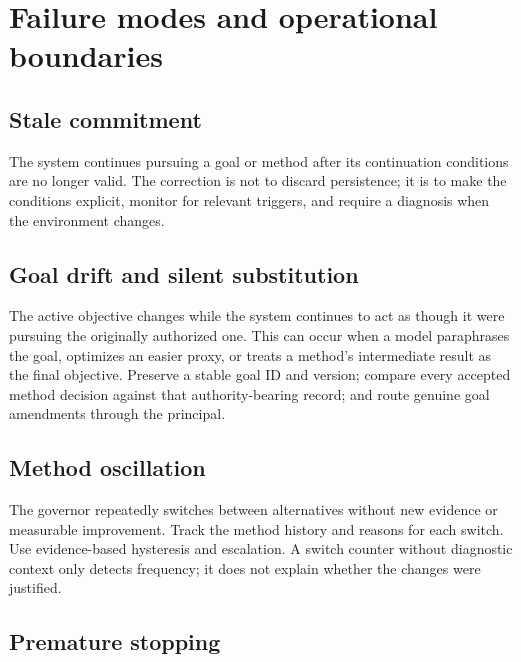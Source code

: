 
\section{Failure modes and operational boundaries}
\label{sec:ch15-failures}

\subsection{Stale commitment}

The system continues pursuing a goal or method after its continuation conditions are no longer valid. The correction is not to discard persistence; it is to make the conditions explicit, monitor for relevant triggers, and require a diagnosis when the environment changes.

\subsection{Goal drift and silent substitution}

The active objective changes while the system continues to act as though it were pursuing the originally authorized one. This can occur when a model paraphrases the goal, optimizes an easier proxy, or treats a method's intermediate result as the final objective. Preserve a stable goal ID and version; compare every accepted method decision against that authority-bearing record; and route genuine goal amendments through the principal.

\subsection{Method oscillation}

The governor repeatedly switches between alternatives without new evidence or measurable improvement. Track the method history and reasons for each switch. Use evidence-based hysteresis and escalation. A switch counter without diagnostic context only detects frequency; it does not explain whether the changes were justified.

\subsection{Premature stopping}

